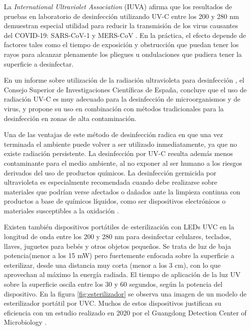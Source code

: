 La \emph{International Ultraviolet Association}  (IUVA) afirma que los resultados de pruebas en laboratorio de desinfección utilizando UV-C entre los 200 y 280 nm demuestran especial utilidad para reducir la transmisión de los virus causantes del COVID-19:  SARS-CoV-1 y MERS-CoV \citep{IUA}. En la práctica, el efecto depende de factores tales como  el tiempo de exposición y obstrucción que puedan tener los rayos para alcanzar plenamente los pliegues u ondulaciones que pudiera tener la superficie a desinfectar. 

En un informe sobre utilización de la radiación ultravioleta para desinfección \citep{CSIC}, el Consejo Superior de Investigaciones Científicas de España, concluye que el uso de radiación UV-C es muy adecuado para la desinfección de microorganismos y de virus, y propone su uso en combinación con métodos tradicionales para la desinfección en  zonas de alta contaminación.

Una de las ventajas de este método de desinfección radica en que una vez terminada el ambiente puede volver a ser utilizado inmediatamente, ya que no existe radiación persistente. La desinfección  por UV-C resulta además menos contaminante para el medio ambiente, al no exponer al ser humano a los riesgos derivados del uso de productos químicos. La desinfección germicida por ultravioleta es especialmente recomendada cuando debe realizarse sobre materiales que podrían verse afectados o dañados ante la limpieza continua con productos a base de químicos líquidos, como ser dispositivos electrónicos o materiales susceptibles a la  oxidación \citep{interior}. 
%

Existen también dispositivos portátiles de esterilización con LEDs UVC en la longitud de onda entre los 200 y 280 nm para desinfectar celulares, teclados, llaves, juguetes para bebés y otros objetos pequeños. Se trata de luz de baja potencia(menor a los 15 mW) pero fuertemente enfocada sobre la superficie a esterilizar, desde una distancia muy corta (menor a los 3 cm), con lo que aprovechan al máximo la energía radiada. El tiempo de  aplicación de la luz UV sobre la superficie oscila entre los 30 y 60 segundos, según la potencia del dispositivo. En la figura \ref{fig:esterilizador} se observa una imagen de un modelo de esterilizador portátil por UVC. Muchos de estos dispositivos justifican su eficiencia con un estudio realizado en 2020 por el Guangdong Detection Center of Microbiology \citep{Guangdong}.   


